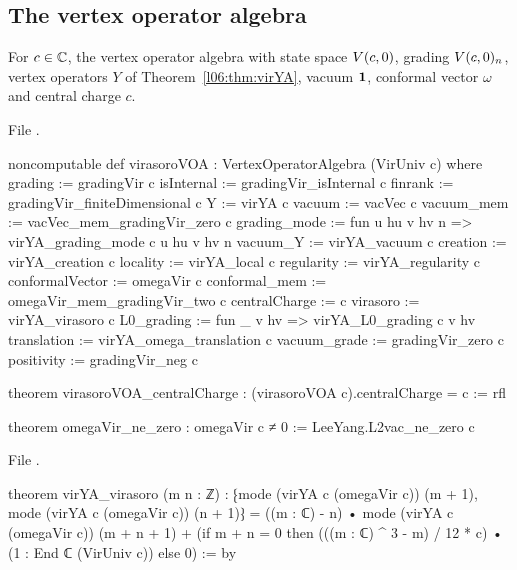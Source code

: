 \subsection{The vertex operator algebra}

\begin{definition}\label{l06:def:virVOA}
For $c\in{\mathbb{C}}$, the vertex operator algebra with state space $V(c,0)$, grading $V(c,0)_n$, vertex
operators $Y$ of Theorem~\ref{l06:thm:virYA}, vacuum $\mathbf{1}$, conformal vector $\omega$ and central
charge $c$.
\end{definition}

File .
\begin{leancode}
noncomputable def virasoroVOA : VertexOperatorAlgebra (VirUniv c) where
  grading := gradingVir c
  isInternal := gradingVir_isInternal c
  finrank := gradingVir_finiteDimensional c
  Y := virYA c
  vacuum := vacVec c
  vacuum_mem := vacVec_mem_gradingVir_zero c
  grading_mode := fun u hu v hv n => virYA_grading_mode c u hu v hv n
  vacuum_Y := virYA_vacuum c
  creation := virYA_creation c
  locality := virYA_local c
  regularity := virYA_regularity c
  conformalVector := omegaVir c
  conformal_mem := omegaVir_mem_gradingVir_two c
  centralCharge := c
  virasoro := virYA_virasoro c
  L0_grading := fun {_} v hv => virYA_L0_grading c v hv
  translation := virYA_omega_translation c
  vacuum_grade := gradingVir_zero c
  positivity := gradingVir_neg c

theorem virasoroVOA_centralCharge : (virasoroVOA c).centralCharge = c := rfl

theorem omegaVir_ne_zero : omegaVir c ≠ 0 := LeeYang.L2vac_ne_zero c
\end{leancode}
File .
\begin{leancode}
theorem virYA_virasoro (m n : ℤ) :
    ⁅mode (virYA c (omegaVir c)) (m + 1), mode (virYA c (omegaVir c)) (n + 1)⁆
      = ((m : ℂ) - n) • mode (virYA c (omegaVir c)) (m + n + 1)
        + (if m + n = 0 then (((m : ℂ) ^ 3 - m) / 12 * c) • (1 : End ℂ (VirUniv c)) else 0) := by
\end{leancode}

